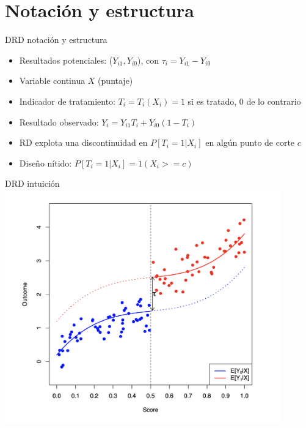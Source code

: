 \documentclass[
  ignorenonframetext,
]{beamer}
\begin{document}
\hypertarget{notaciuxf3n-y-estructura}{%
\section{Notación y estructura}\label{notaciuxf3n-y-estructura}}

\begin{frame}{DRD notación y estructura}
\protect\hypertarget{drd-notaciuxf3n-y-estructura}{}
\begin{itemize}
\item
  Resultados potenciales: (\(Y_{i1},Y_{i0}\)), con
  \(\tau_i =Y_{i1} - Y_{i0}\)
\item
  Variable continua \(X\) (puntaje)
\item
  Indicador de tratamiento: \(T_i = T_i(X_i) = 1\) si es tratado, 0 de
  lo contrario
\item
  Resultado observado: \(Y_i = Y_{i1}T_i + Y_{i0}(1 - T_i)\)
\item
  RD explota una discontinuidad en \(P[T_i = 1 | X_i]\) en algún punto
  de corte \(c\)
\item
  Diseño nítido: \(P[T_i = 1 | X_i] = 1(X_i >= c)\)
\end{itemize}
\end{frame}

\begin{frame}{DRD intuición}
\protect\hypertarget{drd-intuiciuxf3n}{}
\includegraphics[width=0.9\textwidth,height=\textheight]{rd1}
\end{frame}
\end{document}
